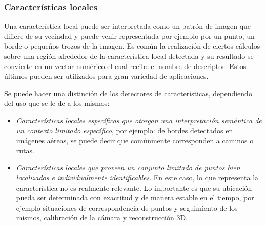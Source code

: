 \subsubsection{Características locales}
\label{c:deteccioncaracteristicas}
Una característica local puede ser interpretada como un patrón de imagen que difiere de su vecindad y puede venir representada por ejemplo por un punto, un borde o pequeños trozos de la imagen. Es común la realización de ciertos cálculos sobre una región alrededor de la característica local detectada y su resultado se convierte en un vector numérico el cual recibe el nombre de descriptor. Estos últimos pueden ser utilizados para gran variedad de aplicaciones.

Se puede hacer una distinción de los detectores de características, dependiendo del uso que se le de a los mismos:
\begin{itemize}
 \item \textit{Características locales específicas que otorgan una interpretación semántica de un contexto limitado específico}, por ejemplo: de bordes detectados en imágenes aéreas, se puede decir que comúnmente corresponden a caminos o rutas.
 \item \textit{Características locales que proveen un conjunto limitado de puntos bien localizados e individualmente identificables}. En este caso, lo que representa la característica no es realmente relevante. Lo importante es que su ubicación pueda ser determinada con exactitud y de manera estable en el tiempo, por ejemplo situaciones de correspondencia de puntos y seguimiento de los mismos, calibración de la cámara y reconstrucción 3D.
\end{itemize}

